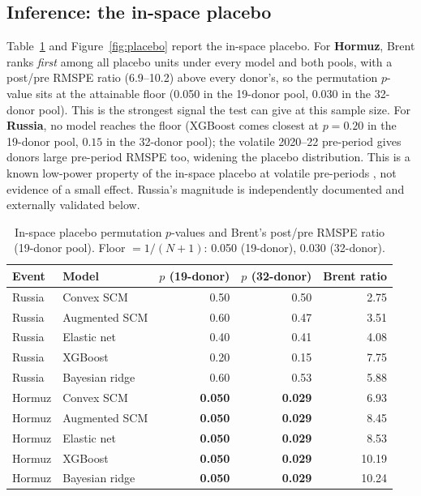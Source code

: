 \documentclass[11pt,a4paper]{article}
\begin{document}
\subsection{Inference: the in-space placebo}
Table~\ref{tab:placebo} and Figure~\ref{fig:placebo} report the in-space placebo. For
\textbf{Hormuz}, Brent ranks \emph{first} among all placebo units under every model and
both pools, with a post/pre RMSPE ratio (6.9--10.2) above every donor's, so the
permutation $p$-value sits at the attainable floor (0.050 in the 19-donor pool, 0.030 in
the 32-donor pool). This is the strongest signal the test can give at this sample size.
For \textbf{Russia}, no model reaches the floor (XGBoost comes closest at $p=0.20$ in the
19-donor pool, $0.15$ in the 32-donor pool); the
volatile 2020--22 pre-period gives donors large pre-period RMSPE too, widening the placebo
distribution. This is a known low-power property of the in-space placebo at volatile
pre-periods \citep{abadie2010}, not evidence of a small effect. Russia's magnitude is
independently documented and externally validated below.

\begin{table}[h]
\centering
\caption{In-space placebo permutation $p$-values and Brent's post/pre RMSPE ratio
(19-donor pool). Floor $=1/(N{+}1)$: 0.050 (19-donor), 0.030 (32-donor).}
\label{tab:placebo}
\small
\begin{tabular}{@{}llrrr@{}}
\toprule
Event & Model & $p$ (19-donor) & $p$ (32-donor) & Brent ratio \\
\midrule
Russia & Convex SCM     & 0.50 & 0.50 & 2.75 \\
Russia & Augmented SCM  & 0.60 & 0.47 & 3.51 \\
Russia & Elastic net    & 0.40 & 0.41 & 4.08 \\
Russia & XGBoost        & 0.20 & 0.15 & 7.75 \\
Russia & Bayesian ridge & 0.60 & 0.53 & 5.88 \\
\addlinespace
Hormuz & Convex SCM     & \textbf{0.050} & \textbf{0.029} & 6.93 \\
Hormuz & Augmented SCM  & \textbf{0.050} & \textbf{0.029} & 8.45 \\
Hormuz & Elastic net    & \textbf{0.050} & \textbf{0.029} & 8.53 \\
Hormuz & XGBoost        & \textbf{0.050} & \textbf{0.029} & 10.19 \\
Hormuz & Bayesian ridge & \textbf{0.050} & \textbf{0.029} & 10.24 \\
\bottomrule
\end{tabular}
\end{table}
\end{document}
